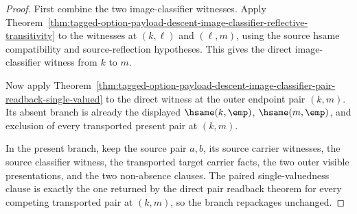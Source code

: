 \begin{proof}
First combine the two image-classifier witnesses. Apply
Theorem~\ref{thm:tagged-option-payload-descent-image-classifier-reflective-transitivity}
to the witnesses at $(k,\ell)$ and $(\ell,m)$, using the source hsame
compatibility and source-reflection hypotheses. This gives the direct
image-classifier witness from $k$ to $m$.

Now apply
Theorem~\ref{thm:tagged-option-payload-descent-image-classifier-pair-readback-single-valued}
to the direct witness at the outer endpoint pair $(k,m)$. Its absent branch is
already the displayed $\hsame(k,\emp)$, $\hsame(m,\emp)$, and exclusion of every
transported present pair at $(k,m)$.

In the present branch, keep the source pair $a,b$, its source carrier witnesses,
the source classifier witness, the transported target carrier facts, the two
outer visible presentations, and the two non-absence clauses. The paired
single-valuedness clause is exactly the one returned by the direct pair
readback theorem for every competing transported pair at $(k,m)$, so the branch
repackages unchanged.
\end{proof}


